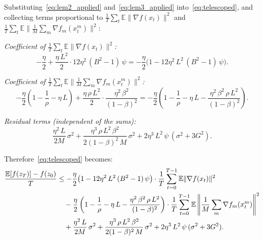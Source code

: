 \documentclass{article}
\begin{document}
Substituting~\eqref{eq:lem2_applied} and~\eqref{eq:lem3_applied}
into~\eqref{eq:telescoped}, and collecting terms proportional to
$\frac{1}{T}\sum_t\mathbb{E}\|\nabla f(x_t)\|^2$ and
$\frac{1}{T}\sum_t\mathbb{E}\|\frac{1}{M}\sum_m\nabla f_m(x_t^m)\|^2$:

\medskip
\noindent\emph{Coefficient of $\frac{1}{T}\sum_t\mathbb{E}\|\nabla f(x_t)\|^2$:}
\begin{equation}
-\frac{\eta}{2} + \frac{\eta\,L^2}{2}\cdot 12\eta^2\,(B^2-1)\,\psi
= -\frac{\eta}{2}\bigl(1 - 12\eta^2\,L^2\,(B^2-1)\,\psi\bigr).
\label{eq:coeff_grad}
\end{equation}

\noindent\emph{Coefficient of $\frac{1}{T}\sum_t\mathbb{E}\|\frac{1}{M}\sum_m\nabla f_m(x_t^m)\|^2$:}
\begin{equation}
-\frac{\eta}{2}\left(1 - \frac{1}{\rho} - \eta\,L\right)
+ \frac{\eta\,\rho\,L^2}{2}\cdot\frac{\eta^2\,\beta^2}{(1-\beta)^2}
= -\frac{\eta}{2}\left(1 - \frac{1}{\rho} - \eta\,L
  - \frac{\eta^2\,\beta^2\,\rho\,L^2}{(1-\beta)^2}\right).
\label{eq:coeff_hetero}
\end{equation}

\noindent\emph{Residual terms (independent of the sums):}
\begin{equation}
\frac{\eta^2\,L}{2M}\,\sigma^2
+ \frac{\eta^3\,\rho\,L^2\,\beta^2}{2(1-\beta)^2\,M}\,\sigma^2
+ 2\eta^3\,L^2\,\psi\,(\sigma^2 + 3G^2).
\label{eq:residual}
\end{equation}

Therefore~\eqref{eq:telescoped} becomes:
\begin{align}
\frac{\mathbb{E}[f(z_T)] - f(z_0)}{T}
&\leq -\frac{\eta}{2}\bigl(1 - 12\eta^2\,L^2\,(B^2-1)\,\psi\bigr)
    \cdot\frac{1}{T}\sum_{t=0}^{T-1}\mathbb{E}\|\nabla f(x_t)\|^2
    \notag \\
&\quad- \frac{\eta}{2}\left(1 - \frac{1}{\rho} - \eta\,L
  - \frac{\eta^2\,\beta^2\,\rho\,L^2}{(1-\beta)^2}\right)
    \cdot\frac{1}{T}\sum_{t=0}^{T-1}\mathbb{E}\left\|\frac{1}{M}\sum_m
    \nabla f_m(x_t^m)\right\|^2 \notag \\
&\quad+ \frac{\eta^2\,L}{2M}\,\sigma^2
  + \frac{\eta^3\,\rho\,L^2\,\beta^2}{2(1-\beta)^2\,M}\,\sigma^2
  + 2\eta^3\,L^2\,\psi\,(\sigma^2 + 3G^2).
\label{eq:step4_assembled}
\end{align}
\end{document}
